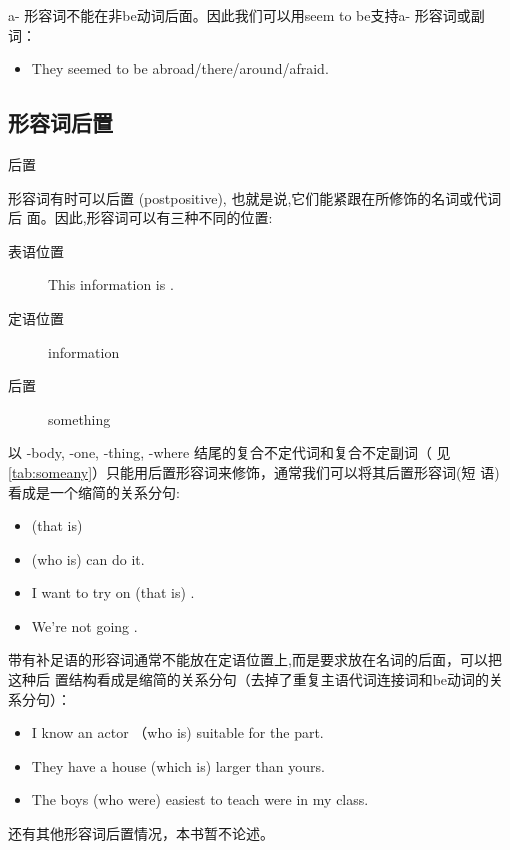 a- 形容词不能在非be动词后面。因此我们可以用seem to be支持a- 形容词或副词：
\begin{itemize}
\item They seemed to be abroad/there/around/afraid.
\end{itemize}

\subsection{形容词后置}
后置

形容词有时可以后置 (postpositive), 也就是说,它们能紧跟在所修饰的名词或代词后
面。因此,形容词可以有三种不同的位置:
\begin{description}
\item[表语位置] This information is .
\item[定语位置]  information
\item[后置] something 
\end{description}

以 -body, -one, -thing, -where 结尾的复合不定代词和复合不定副词（
见\cref{tab:someany}）只能用后置形容词来修饰，通常我们可以将其后置形容词(短
语)看成是一个缩简的关系分句:
\begin{itemize}
\item {} (that is) 
\item {} (who is)  can do it.
\item I want to try on  (that is) .
\item We're not going  .
\end{itemize}


带有补足语的形容词通常不能放在定语位置上,而是要求放在名词的后面，可以把这种后
置结构看成是缩简的关系分句（去掉了重复主语代词连接词和be动词的关系分句）：
\begin{itemize}
\item I know an actor （who is) suitable for the part.
\item They have a house (which is) larger than yours.
\item The boys (who were) easiest to teach were in my class.
\end{itemize}

还有其他形容词后置情况，本书暂不论述。

